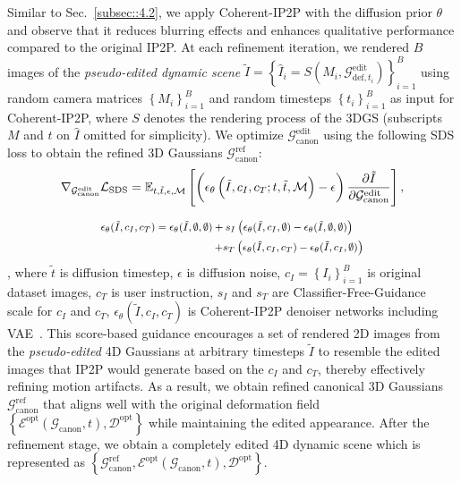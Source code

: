 Similar to Sec.~\ref{subsec::4.2}, we apply Coherent-IP2P with the diffusion prior $\theta$ and observe that it reduces blurring effects and enhances qualitative performance compared to the original IP2P. At each refinement iteration, we rendered $B$ images of the \textit{pseudo-edited dynamic scene} $\tilde{I} = \left\{ \hat{I}_i = S(M_i, \mathcal{G}_{\text{def},t_i}^\text{edit}) \right\}_{i=1}^B$ using random camera matrices $\left\{ M_i \right\}_{i=1}^B$ and random timesteps $\left\{ t_i \right\}_{i=1}^B$ as input for Coherent-IP2P, where $S$ denotes the rendering process of the 3DGS (subscripts $M$ and $t$ on $\hat{I}$ omitted for simplicity). We optimize $\mathcal{G}_{\text{canon}}^\text{edit}$ using the following SDS loss to obtain the refined 3D Gaussians $\mathcal{G}_{\text{canon}}^\text{ref}$:
\vspace{-2mm}
\begin{equation}
    \scriptsize
    \nabla_{\mathcal{G}_{\text{canon}}^{\text{edit}}} \mathcal{L}_{\text{SDS}} = \mathbb{E}_{t, \tilde{t}, \epsilon, \mathcal{M}} \left[ \left( \epsilon_{\theta} \left( \tilde{I}, c_I, c_T; t, \tilde{t}, \mathcal{M} \right) - \epsilon \right) \frac{\partial \tilde{I}}{\partial \mathcal{G}_{\text{canon}}^{\text{edit}}} \right],
\label{eq::eq1}
\end{equation}

\vspace{-4mm}
\begin{equation}
    \footnotesize
    \begin{split}
        \epsilon_{\theta}(\tilde{I}, c_I, c_T) = \epsilon_{\theta}(\tilde{I}, \emptyset, \emptyset) + s_I \left( \epsilon_{\theta}(\tilde{I}, c_I, \emptyset) - \epsilon_{\theta}(\tilde{I}, \emptyset, \emptyset) \right) \quad \\ + s_T \left( \epsilon_{\theta}(\tilde{I}, c_I, c_T) - \epsilon_{\theta}(\tilde{I}, c_I, \emptyset) \right)
    \end{split}
\label{eq::eq2}
\end{equation}
, where $\tilde{t}$ is diffusion timestep, $\epsilon$ is diffusion noise, $c_I = \left\{ I_i \right\}_{i=1}^B$ is original dataset images, $c_T$ is user instruction, $s_I$ and $s_T$ are Classifier-Free-Guidance~\cite{ref_43_classifierfree} scale for $c_I$ and $c_T$, $\epsilon_{\theta}(\tilde{I}, c_I, c_T)$ is Coherent-IP2P denoiser networks including VAE~\cite{ref_44_vae}. This score-based guidance encourages a set of rendered 2D images from the \textit{pseudo-edited} 4D Gaussians at arbitrary timesteps $\tilde{I}$ to resemble the edited images that IP2P would generate based on the $c_I$ and $c_T$, thereby effectively refining motion artifacts. As a result, we obtain refined canonical 3D Gaussians $\mathcal{G}_{\text{canon}}^\text{ref}$ that aligns well with the original deformation field $\left\{\mathcal{E}^\text{opt}(\mathcal{G}_{\text{canon}}, t), \mathcal{D}^\text{opt}\right\}$ while maintaining the edited appearance. After the refinement stage, we obtain a completely edited 4D dynamic scene which is represented as $\left\{\mathcal{G}_{\text{canon}}^\text{ref},\mathcal{E}^\text{opt}(\mathcal{G}_{\text{canon}}, t), \mathcal{D}^\text{opt}\right\}$.